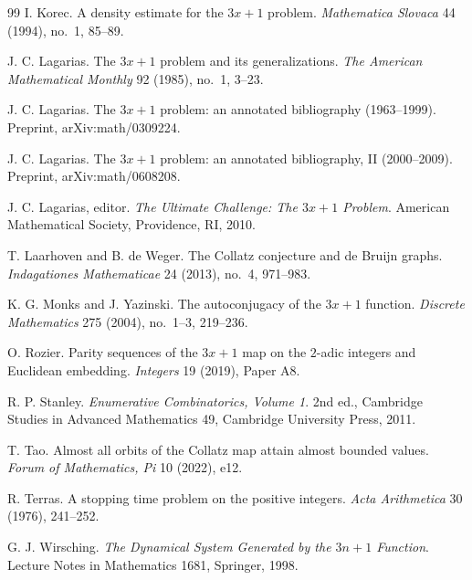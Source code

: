 \documentclass[11pt]{article}
\theoremstyle{definition}
\theoremstyle{remark}
\begin{document}
\begin{thebibliography}{99}
I. Korec.
A density estimate for the $3x+1$ problem.
\emph{Mathematica Slovaca} 44 (1994), no.~1, 85--89.

J. C. Lagarias.
The $3x+1$ problem and its generalizations.
\emph{The American Mathematical Monthly} 92 (1985), no.~1, 3--23.

J. C. Lagarias.
The $3x+1$ problem: an annotated bibliography (1963--1999).
Preprint, arXiv:math/0309224.

J. C. Lagarias.
The $3x+1$ problem: an annotated bibliography, II (2000--2009).
Preprint, arXiv:math/0608208.

J. C. Lagarias, editor.
\emph{The Ultimate Challenge: The $3x+1$ Problem}.
American Mathematical Society, Providence, RI, 2010.

T. Laarhoven and B. de Weger.
The Collatz conjecture and de Bruijn graphs.
\emph{Indagationes Mathematicae} 24 (2013), no.~4, 971--983.

K. G. Monks and J. Yazinski.
The autoconjugacy of the $3x+1$ function.
\emph{Discrete Mathematics} 275 (2004), no.~1--3, 219--236.

O. Rozier.
Parity sequences of the $3x+1$ map on the $2$-adic integers and Euclidean embedding.
\emph{Integers} 19 (2019), Paper A8.

R. P. Stanley.
\emph{Enumerative Combinatorics, Volume 1}.
2nd ed., Cambridge Studies in Advanced Mathematics 49, Cambridge University Press, 2011.

T. Tao.
Almost all orbits of the Collatz map attain almost bounded values.
\emph{Forum of Mathematics, Pi} 10 (2022), e12.

R. Terras.
A stopping time problem on the positive integers.
\emph{Acta Arithmetica} 30 (1976), 241--252.

G. J. Wirsching.
\emph{The Dynamical System Generated by the $3n+1$ Function}.
Lecture Notes in Mathematics 1681, Springer, 1998.

\end{thebibliography}
\end{document}
